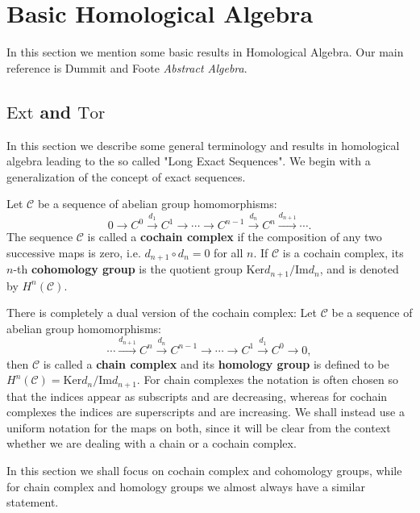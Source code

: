 \section{Basic Homological Algebra}
In this section we mention some basic results in Homological Algebra. Our main reference is Dummit and Foote \textit{Abstract Algebra}.
\subsection{$\mathrm{Ext}$ and $\mathrm{Tor}$}
In this section we describe some general terminology and results in homological algebra leading to the so called "Long Exact Sequences". We begin with a generalization of the concept of exact sequences.
\begin{definition}
Let $\mathcal{C}$ be a sequence of abelian group homomorphisms: 
$$
0\longrightarrow C^0\overset{d_1}{\longrightarrow}C^1\longrightarrow \cdots \longrightarrow C^{n-1}\overset{d_n}{\longrightarrow}C^n\overset{d_{n+1}}{\longrightarrow}\cdots .
$$
The sequence $\mathcal{C}$ is called a \textbf{cochain complex} if the composition of any two successive maps is zero, i.e. $d_{n+1}\circ d_n=0$ for all $n$. If $\mathcal{C}$ is a cochain complex, its $n$-th \textbf{cohomology group} is the quotient group $\mathrm{Ker}d_{n+1}/\mathrm{Im}d_n$, and is denoted by $H^n(\mathcal{C})$.
\end{definition}
There is completely a dual version of the cochain complex: Let $\mathcal{C}$ be a sequence of abelian group homomorphisms: 
$$
\cdots \overset{d_{n+1}}{\longrightarrow}C^n\overset{d_n}{\longrightarrow}C^{n-1}\longrightarrow \cdots \longrightarrow C^1\overset{d_1}{\longrightarrow}C^0\longrightarrow 0,
$$
then $\mathcal{C}$ is called a \textbf{chain complex} and its \textbf{homology group} is defined to be $H^n(\mathcal{C})=\mathrm{Ker}d_n/\mathrm{Im}d_{n+1}$.  For chain complexes the notation is often chosen so that the indices appear as subscripts and are decreasing, whereas for cochain complexes the indices are superscripts and are increasing. We shall instead use a uniform notation for the maps on both, since it will be clear from the context whether we are dealing with a chain or a cochain complex.\par
In this section we shall focus on cochain complex and cohomology groups, while for chain complex and homology groups we almost always have a similar statement.\par
